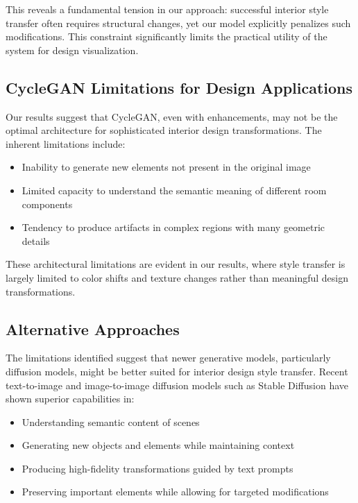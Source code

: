 \documentclass[twocolumn,superscriptaddress,aps]{revtex4-1}
\begin{document}
This reveals a fundamental tension in our approach: successful interior style transfer often requires structural changes, yet our model explicitly penalizes such modifications. This constraint significantly limits the practical utility of the system for design visualization.

\subsection{CycleGAN Limitations for Design Applications}

Our results suggest that CycleGAN, even with enhancements, may not be the optimal architecture for sophisticated interior design transformations. The inherent limitations include:

\begin{itemize}
    \item Inability to generate new elements not present in the original image
    \item Limited capacity to understand the semantic meaning of different room components
    \item Tendency to produce artifacts in complex regions with many geometric details
\end{itemize}

These architectural limitations are evident in our results, where style transfer is largely limited to color shifts and texture changes rather than meaningful design transformations.

\subsection{Alternative Approaches}

The limitations identified suggest that newer generative models, particularly diffusion models, might be better suited for interior design style transfer. Recent text-to-image and image-to-image diffusion models such as Stable Diffusion have shown superior capabilities in:

\begin{itemize}
    \item Understanding semantic content of scenes
    \item Generating new objects and elements while maintaining context
    \item Producing high-fidelity transformations guided by text prompts
    \item Preserving important elements while allowing for targeted modifications
\end{itemize}
\end{document}
